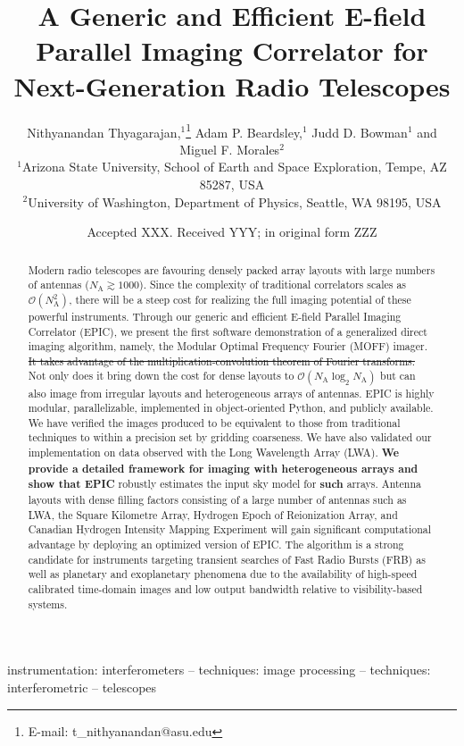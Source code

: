 \documentclass[a4paper,fleqn,usenatbib]{mnras}
\title[E-field Parallel Imaging Correlator]{A Generic and Efficient E-field Parallel Imaging Correlator for Next-Generation Radio Telescopes}
\author[Thyagarajan et al.]{
Nithyanandan Thyagarajan,$^{1}$\thanks{E-mail: t\_nithyanandan@asu.edu}
Adam P. Beardsley,$^{1}$
Judd D. Bowman$^{1}$
\newauthor
and Miguel F. Morales$^{2}$
\\
$^{1}$Arizona State University, School of Earth and Space Exploration, Tempe, AZ 85287, USA\\
$^{2}$University of Washington, Department of Physics, Seattle, WA 98195, USA\\
}
\date{Accepted XXX. Received YYY; in original form ZZZ}
\newcommand{\Nant}{N_\textrm{A}}
\begin{document}
\label{firstpage}
\pagerange{\pageref{firstpage}--\pageref{lastpage}}
\maketitle

\begin{abstract}
Modern radio telescopes are favouring densely packed array layouts with large numbers of antennas ($\Nant\gtrsim 1000$). Since the complexity of traditional correlators scales as $\mathcal{O}(\Nant^2)$, there will be a steep cost for realizing the full imaging potential of these powerful instruments. Through our generic and efficient E-field Parallel Imaging Correlator (EPIC), we present the first software demonstration of a generalized direct imaging algorithm, namely, the Modular Optimal Frequency Fourier (MOFF) imager. \sout{It takes advantage of the multiplication-convolution theorem of Fourier transforms.} Not only does it bring down the cost for dense layouts to $\mathcal{O}(\Nant\log_2\Nant)$ but can also image from irregular layouts and heterogeneous arrays of antennas. EPIC is highly modular, parallelizable, implemented in object-oriented Python, and publicly available. We have verified the images produced to be equivalent to those from traditional techniques to within a precision set by gridding coarseness. We have also validated our implementation on data observed with the Long Wavelength Array (LWA). {\bf We provide a detailed framework for imaging with heterogeneous arrays and show that EPIC} robustly estimates the input sky model for {\bf such} arrays. Antenna layouts with dense filling factors consisting of a large number of antennas such as LWA, the Square Kilometre Array, Hydrogen Epoch of Reionization Array, and Canadian Hydrogen Intensity Mapping Experiment will gain significant computational advantage by deploying an optimized version of EPIC. The algorithm is a strong candidate for instruments targeting transient searches of Fast Radio Bursts (FRB) as well as planetary and exoplanetary phenomena due to the availability of high-speed calibrated time-domain images and low output bandwidth relative to visibility-based systems.
\end{abstract}

\begin{keywords}
instrumentation: interferometers -- techniques: image processing -- techniques: interferometric -- telescopes
\end{keywords}
\end{document}
